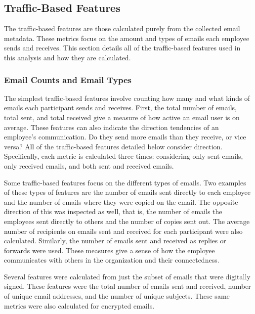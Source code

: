 \documentclass[12pt]{report}
\begin{document}
\subsection{Traffic-Based Features}
The traffic-based features are those calculated purely from the collected email metadata.
These metrics focus on the amount and types of emails each employee sends and receives.
This section details all of the traffic-based features used in this analysis and how they are calculated. 

\subsubsection{Email Counts and Email Types}
The simplest traffic-based features involve counting how many and what kinds of emails each participant sends and receives.
First, the total number of emails, total sent, and total received give a measure of how active an email user is on average.
These features can also indicate the direction tendencies of an employee's communication. 
Do they send more emails than they receive, or vice versa?  All of the traffic-based features detailed below consider direction.
Specifically, each metric is calculated three times: considering only sent emails, only received emails, and both sent and received emails.

Some traffic-based features focus on the different types of emails.
Two examples of these types of features are the number of emails sent directly to each employee and the number of emails where they were copied on the email.
The opposite direction of this was inspected as well, that is, the number of emails the employees sent directly to others and the number of copies sent out.
The average number of recipients on emails sent and received for each participant were also calculated.
Similarly, the number of emails sent and received as replies or forwards were used.
These measures give a sense of how the employee communicates with others in the organization and their connectedness.

Several features were calculated from just the subset of emails that were digitally signed.  These features were the total number of emails sent and received, number of unique email addresses, and the number of unique subjects.
These same metrics were also calculated for encrypted emails.
\end{document}
